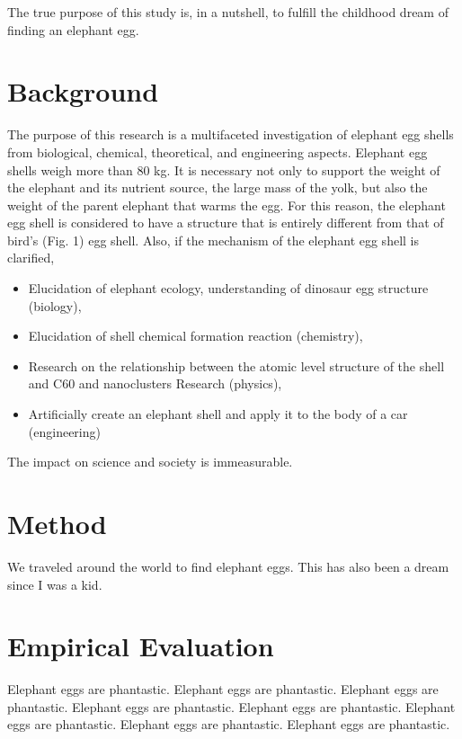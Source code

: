 The true purpose of this study is, in a nutshell, to fulfill the childhood dream of finding an elephant egg.

\section{Background}

The purpose of this research is
a multifaceted investigation of elephant egg shells from biological, chemical, theoretical, and engineering aspects.
Elephant egg shells weigh more than 80 kg.
It is necessary not only to support the weight of the elephant and its
nutrient source, the large mass of the yolk, but also the weight of the
parent elephant that warms the egg. For this reason, the elephant egg
shell is considered to have a structure that is entirely different
from that of bird's (Fig. 1) egg shell. Also, if the mechanism
of the elephant egg shell is clarified,

\begin{itemize}
 \item Elucidation of elephant ecology, understanding of dinosaur egg structure (biology),
 \item Elucidation of shell chemical formation reaction (chemistry),
 \item Research on the relationship between the atomic level structure of the shell and C60 and nanoclusters Research (physics),
 \item Artificially create an elephant shell and apply it to the body of a car (engineering)
\end{itemize}

The impact on science and society is immeasurable.

\section{Method}

We traveled around the world to find elephant eggs. This has also been a dream since I was a kid. 

\section{Empirical Evaluation}

Elephant eggs are phantastic. 
Elephant eggs are phantastic. 
Elephant eggs are phantastic. 
Elephant eggs are phantastic. 
Elephant eggs are phantastic. 
Elephant eggs are phantastic. 
Elephant eggs are phantastic. 
Elephant eggs are phantastic. 

